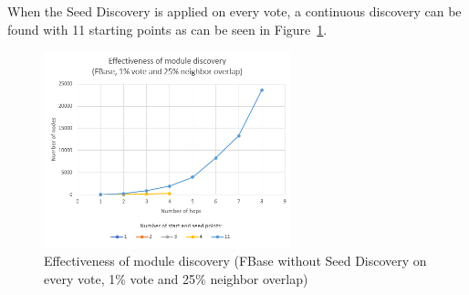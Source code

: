 When the Seed Discovery is applied on every vote, a continuous discovery can be found with 11 starting points as can be seen in Figure~\ref{fig:discovery-fbase-extended-25}.

\begin{figure}[ht!]
	\centering
	\includegraphics[width=0.64\textwidth]{images/evaluation-discovery-fbase-extented-25.png}
	\caption{\label{fig:discovery-fbase-extended-25} Effectiveness of module discovery (FBase without Seed Discovery on every vote, 1\% vote and 25\% neighbor overlap)}
\end{figure}


